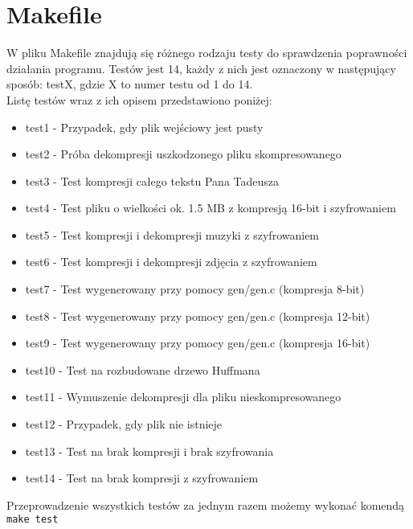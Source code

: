 \documentclass[]{article}
\begin{document}
\section{Makefile}\label{header-n231}
W pliku Makefile znajdują się różnego rodzaju testy do sprawdzenia poprawności działania programu.
Testów jest 14, każdy z nich jest oznaczony w następujący sposób: testX, gdzie X to numer testu od 1 do 14.
\\Listę testów wraz z ich opisem przedstawiono poniżej:
\begin{itemize}
\item
test1 - Przypadek, gdy plik wejściowy jest pusty
\item
test2 - Próba dekompresji uszkodzonego pliku skompresowanego
\item
test3 - Test kompresji całego tekstu Pana Tadeusza
\item
test4 - Test pliku o wielkości ok. 1.5 MB z kompresją 16-bit i szyfrowaniem
\item
test5 - Test kompresji i dekompresji muzyki z szyfrowaniem
\item
test6 - Test kompresji i dekompresji zdjęcia z szyfrowaniem
\item
test7 - Test wygenerowany przy pomocy gen/gen.c (kompresja 8-bit)
\item
test8 - Test wygenerowany przy pomocy gen/gen.c (kompresja 12-bit)
\item
test9 - Test wygenerowany przy pomocy gen/gen.c (kompresja 16-bit)
\item
test10 - Test na rozbudowane drzewo Huffmana
\item
test11 - Wymuszenie dekompresji dla pliku nieskompresowanego
\item
test12 - Przypadek, gdy plik nie istnieje
\item
test13 - Test na brak kompresji i brak szyfrowania
\item
test14 - Test na brak kompresji z szyfrowaniem\\
\end{itemize}
Przeprowadzenie wszystkich testów za jednym razem możemy wykonać komendą \texttt{make test}
\end{document}
